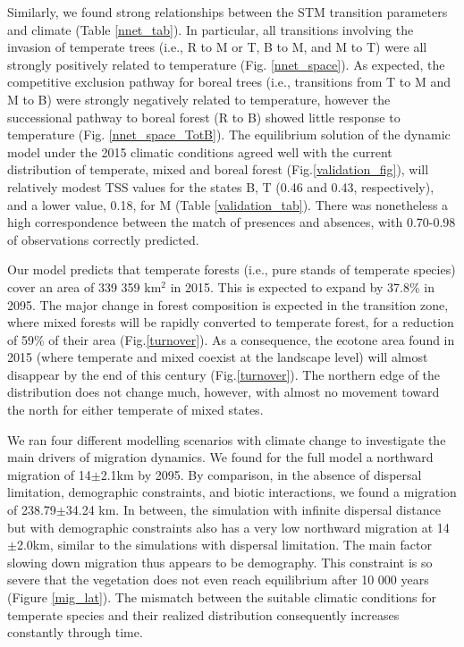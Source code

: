 Similarly, we found strong relationships between the STM transition parameters and climate (Table
\ref{nnet_tab}). In particular, all transitions involving the invasion of temperate trees (i.e., R
to M or T, B to M, and M to T) were all strongly positively related to temperature (Fig.
\ref{nnet_space}). As expected, the competitive exclusion pathway for boreal trees (i.e.,
transitions from T to M and M to B) were strongly negatively related to temperature, however the
successional pathway to boreal forest (R to B) showed little response to temperature (Fig.
\ref{nnet_space_TotB}). The equilibrium solution of the dynamic model under the 2015 climatic
conditions agreed well with the current distribution of temperate, mixed and boreal forest
(Fig.\ref{validation_fig}), will relatively  modest TSS values for the states B, T (0.46 and 0.43,
respectively), and a lower value, 0.18, for M (Table \ref{validation_tab}). There was nonetheless a
high correspondence between the match of presences and absences, with 0.70-0.98 of observations
correctly predicted.

Our model predicts that temperate forests (i.e., pure stands of temperate species) cover an area of
339 359 km$^2$ in 2015. This is expected to expand by 37.8\% in 2095. The major change in forest
composition is expected in the transition zone, where mixed forests will be rapidly converted to
temperate forest, for a reduction of 59\% of their area (Fig.\ref{turnover}). As a consequence, the
ecotone area found in 2015 (where temperate and mixed coexist at the landscape level) will almost
disappear by the end of this century (Fig.\ref{turnover}). The northern edge of the distribution
does not change much, however, with almost no movement toward the north for either temperate of
mixed states.

We ran four different modelling scenarios with climate change to investigate the main drivers of
migration dynamics. We found for the full model a northward migration of 14$\pm$2.1km by 2095.  By
comparison, in the absence of dispersal limitation, demographic constraints, and biotic
interactions, we found a migration of 238.79$\pm$34.24 km. In between, the simulation with infinite
dispersal distance but with demographic constraints also has a very low northward migration at
14$\pm$2.0km, similar to the simulations with dispersal limitation. The main factor slowing down
migration thus appears to be demography. This constraint is so severe that the vegetation does not
even reach equilibrium after 10 000 years (Figure \ref{mig_lat}). The mismatch between the suitable
climatic conditions for temperate species and their realized distribution consequently increases
constantly through time.

